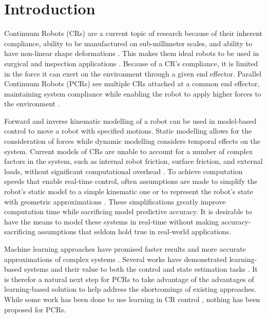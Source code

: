 \section{Introduction}

Continuum Robots (CRs) are a current topic of research because of their inherent compliance, ability to be manufactured on sub-millimeter scales, and ability to have non-linear shape deformations \cite{4058827, survey}. This makes them ideal robots to be used in surgical and inspection applications \cite{7314984, DONG2017218}. Because of a CR’s compliance, it is limited in the force it can exert on the environment through a given end effector. Parallel Continuum Robots (PCRs) see multiple CRs attached at a common end effector, maintaining system compliance while enabling the robot to apply higher forces to the environment \cite{6906943, survey}. 

Forward and inverse kinematic modelling of a robot can be used in model-based control to move a robot with specified motions. Static modelling allows for the consideration of forces while dynamic modelling considers temporal effects on the system. Current models of CRs are unable to account for a number of complex factors in the system, such as internal robot friction, surface friction, and external loads, without significant computational overhead \cite{10.3389/frobt.2020.630245}. To achieve computation speeds that enable real-time control, often assumptions are made to simplify the robot’s static model to a simple kinematic one \cite{9143427} or to represent the robot's state with geometric approximations \cite{10.3389/frobt.2020.630245, 9143427, slilge_2020}. These simplifications greatly improve computation time while sacrificing model predictive accuracy. It is desirable to have the means to model these systems in real-time without making accuracy-sacrificing assumptions that seldom hold true in real-world applications.

Machine learning approaches have promised faster results and more accurate approximations of complex systems \cite{9199280}. Several works have demonstrated learning-based systems and their value to both the control and state estimation tasks \cite{s21062085, 8972568, 8643440, doi:10.1146/annurev-control-090419-075625, TOQUICA2021106682}. It is therefor a natural next step for PCRs to take advantage of the advantages of learning-based solution to help address the shortcomings of existing approaches. While some work has been done to use learning in CR control \cite{10.3389/frobt.2021.730330, grassmann2022a, 7112506}, nothing has been proposed for PCRs. 

